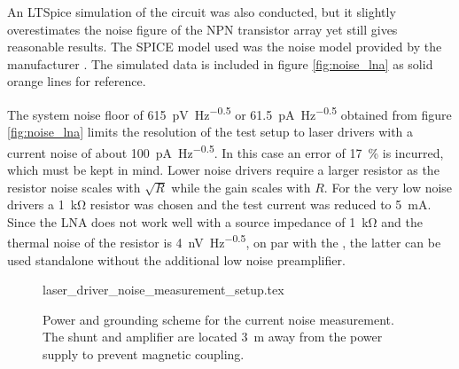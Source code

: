 An LTSpice simulation of the circuit was also conducted, but it slightly overestimates the noise figure of the  NPN transistor array yet still gives reasonable results. The SPICE model used was the noise model provided by the manufacturer \cite{THAT300_noise_model}. The simulated data is included in figure \ref{fig:noise_lna} as solid orange lines for reference.

The system noise floor of \qty{615}{\pV \per \Hz\tothe{0.5}} or \qty{61.5}{\pA \per \Hz\tothe{0.5}} obtained from figure \ref{fig:noise_lna} limits the resolution of the test setup to laser drivers with a current noise of about \qty{100}{\pA \per \Hz\tothe{0.5}}. In this case an error of \qty{17}{\percent} is incurred, which must be kept in mind. Lower noise drivers require a larger resistor as the resistor noise scales with $\sqrt{R}$ while the gain scales with $R$. For the very low noise drivers a \qty{1}{\kilo\ohm} resistor was chosen and the test current was reduced to \qty{5}{\mA}. Since the LNA does not work well with a source impedance of \qty{1}{\kilo\ohm} and the thermal noise of the resistor is \qty{4}{\nV \per \Hz\tothe{0.5}}, on par with the , the latter can be used standalone without the additional low noise preamplifier.
\begin{figure}[ht]
    \centering
        {laser_driver_noise_measurement_setup.tex}
    \caption{Power and grounding scheme for the current noise measurement. The shunt and amplifier are located \qty{3}{\m} away from the power supply to prevent magnetic coupling.}
    \label{fig:laser_driver_noise_measurement_setup}
\end{figure}

